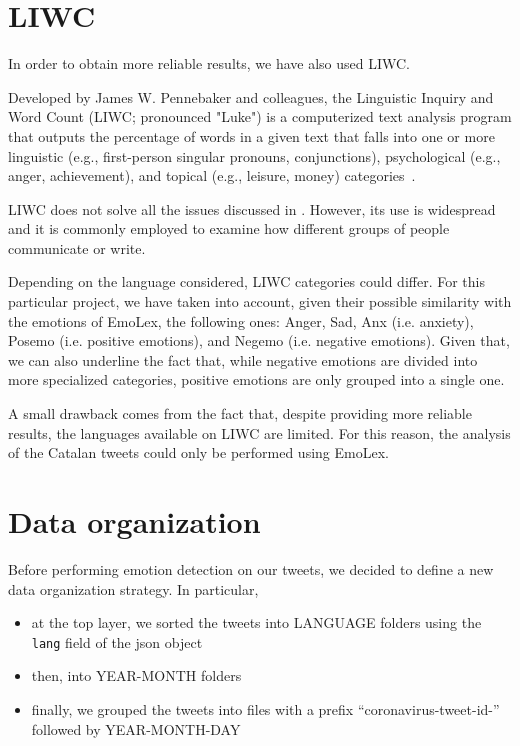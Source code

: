 \section{LIWC}
\label{sec:liwc}

In order to obtain more reliable results, we have also used LIWC.

Developed by James W. Pennebaker and colleagues, the Linguistic Inquiry and Word Count (LIWC; pronounced "Luke") is a computerized text analysis program that outputs the percentage of words in a given text that falls into one or more linguistic (e.g., first-person singular pronouns, conjunctions), psychological (e.g., anger, achievement), and topical (e.g., leisure, money) categories~\cite{liwcwebsite}.

LIWC does not solve all the issues discussed in . However, its use is widespread and it is commonly employed to examine how different groups of people communicate or write.

Depending on the language considered, LIWC categories could differ. For this particular project, we have taken into account, given their possible similarity with the emotions of EmoLex, the following ones: Anger, Sad, Anx (i.e. anxiety), Posemo (i.e. positive emotions), and Negemo (i.e. negative emotions). Given that, we can also underline the fact that, while negative emotions are divided into more specialized categories, positive emotions are only grouped into a single one.

A small drawback comes from the fact that, despite providing more reliable results, the languages available on LIWC are limited. For this reason, the analysis of the Catalan tweets could only be performed using EmoLex.

\section{Data organization}
\label{sub:data-org}

Before performing emotion detection on our tweets, we decided to define a new data organization strategy. In particular,

\begin{itemize}
	\item at the top layer, we sorted the tweets into LANGUAGE folders using the \texttt{lang} field of the json object
	\item then, into YEAR-MONTH folders
	\item finally, we grouped the tweets into files with a prefix “coronavirus-tweet-id-” followed by YEAR-MONTH-DAY
\end{itemize}

